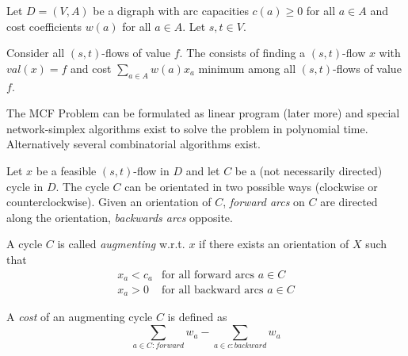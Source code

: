 \begin{lec}[2011-12-08]\end{lec}

\begin{defn}
Let $D = (V, A)$ be a digraph with arc capacities $c(a) \geq 0$ for all $a
\in A$ and cost coefficients $w(a)$ for all $a \in A$. Let $s, t \in V$.

Consider all $(s, t)$-flows of value $f$. The  consists of finding a
$(s,t)$-flow $x$ with $val(x) = f$ and cost $\sum_{a \in A} w(a) x_a$
minimum among all $(s,t)$-flows of value $f$.
\end{defn}

The MCF Problem can be formulated as linear program (later more) and special
network-simplex algorithms exist to solve the problem in polynomial time.
Alternatively several combinatorial algorithms exist.

\begin{defn}
Let $x$ be a feasible $(s,t)$-flow in $D$ and let $C$ be a (not necessarily
directed) cycle in $D$. The cycle $C$ can be orientated in two possible ways
(clockwise or counterclockwise). Given an orientation of $C$, \emph{forward
arcs} on $C$ are directed along the orientation, \emph{backwards arcs} opposite.

A cycle $C$ is called \emph{augmenting} w.r.t. $x$ if there exists an
orientation of $X$ such that
\begin{align*}
x_a < c_a & \text{for all forward arcs } a \in C \\
x_a > 0	& \text{for all backward arcs } a \in C
\end{align*}
\end{defn}

\begin{defn}
A \emph{cost} of an augmenting cycle $C$ is defined as
\[
\sum_{a \in C: forward} w_a - \sum_{a \in c: backward} w_a
\]
\end{defn}

